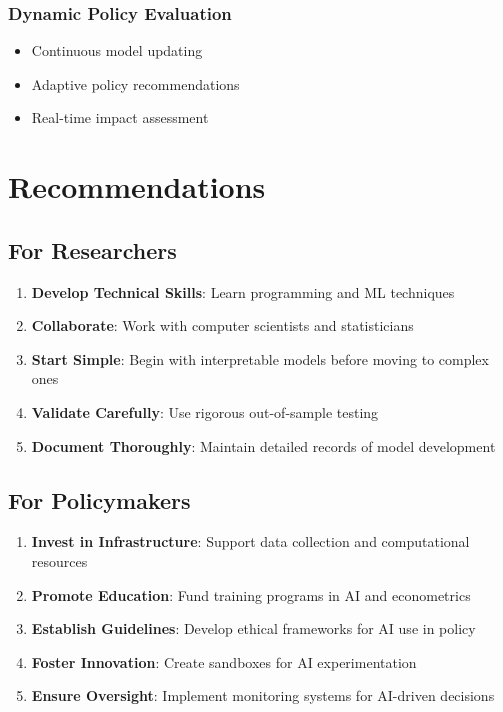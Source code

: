 \documentclass[12pt,a4paper]{article}
\begin{document}
\subsubsection{Dynamic Policy Evaluation}
\begin{itemize}
    \item Continuous model updating
    \item Adaptive policy recommendations
    \item Real-time impact assessment
\end{itemize}

\section{Recommendations}

\subsection{For Researchers}

\begin{enumerate}
    \item \textbf{Develop Technical Skills}: Learn programming and ML techniques
    \item \textbf{Collaborate}: Work with computer scientists and statisticians
    \item \textbf{Start Simple}: Begin with interpretable models before moving to complex ones
    \item \textbf{Validate Carefully}: Use rigorous out-of-sample testing
    \item \textbf{Document Thoroughly}: Maintain detailed records of model development
\end{enumerate}

\subsection{For Policymakers}

\begin{enumerate}
    \item \textbf{Invest in Infrastructure}: Support data collection and computational resources
    \item \textbf{Promote Education}: Fund training programs in AI and econometrics
    \item \textbf{Establish Guidelines}: Develop ethical frameworks for AI use in policy
    \item \textbf{Foster Innovation}: Create sandboxes for AI experimentation
    \item \textbf{Ensure Oversight}: Implement monitoring systems for AI-driven decisions
\end{enumerate}
\end{document}
